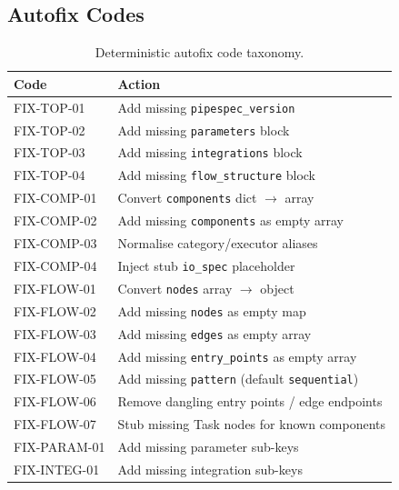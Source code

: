 \documentclass[11pt,a4paper]{article}
\theoremstyle{definition}
\begin{document}
\subsection{Autofix Codes}
\begin{table}[htbp]
\centering
\caption{Deterministic autofix code taxonomy.}
\begin{tabular}{@{}ll@{}}
\toprule
\textbf{Code} & \textbf{Action} \\
\midrule
FIX-TOP-01 & Add missing \texttt{pipespec\_version} \\
FIX-TOP-02 & Add missing \texttt{parameters} block \\
FIX-TOP-03 & Add missing \texttt{integrations} block \\
FIX-TOP-04 & Add missing \texttt{flow\_structure} block \\
FIX-COMP-01 & Convert \texttt{components} dict $\to$ array \\
FIX-COMP-02 & Add missing \texttt{components} as empty array \\
FIX-COMP-03 & Normalise category/executor aliases \\
FIX-COMP-04 & Inject stub \texttt{io\_spec} placeholder \\
FIX-FLOW-01 & Convert \texttt{nodes} array $\to$ object \\
FIX-FLOW-02 & Add missing \texttt{nodes} as empty map \\
FIX-FLOW-03 & Add missing \texttt{edges} as empty array \\
FIX-FLOW-04 & Add missing \texttt{entry\_points} as empty array \\
FIX-FLOW-05 & Add missing \texttt{pattern} (default \texttt{sequential}) \\
FIX-FLOW-06 & Remove dangling entry points / edge endpoints \\
FIX-FLOW-07 & Stub missing Task nodes for known components \\
FIX-PARAM-01 & Add missing parameter sub-keys \\
FIX-INTEG-01 & Add missing integration sub-keys \\
\bottomrule
\end{tabular}
\end{table}
\end{document}
